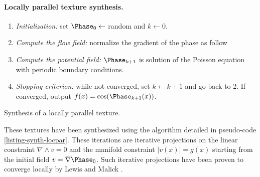 




\paragraph{Locally parallel texture synthesis.} 


\begin{listing}
\begin{enumerate}
	\item \textit{Initialization:} set $\Phase_0 \leftarrow $ random and $k \leftarrow 0$.
	\item \textit{Compute the flow field:} normalize the gradient of the phase as follow 
	\item \textit{Compute the potential field:} $\Phase_{k+1}$ is solution of the Poisson equation 
		with periodic boundary conditions.
	\item \textit{Stopping criterion:} while not converged, set $k \leftarrow k+1$ and go back to 2.
	If converged, output $f(x) = \cos(\Phase_{k+1}(x))$.
\end{enumerate}%
    \caption{Synthesis of a locally parallel texture. \label{listing-synth-locpar}}
\end{listing}
These textures have been synthesized using the algorithm detailed in pseudo-code \ref{listing-synth-locpar}. These iterations are iterative projections on the linear constraint $\nabla \wedge v = 0$ and the manifold constraint $|v(x)|=g(x)$ starting from the initial field $v=\nabla \Phase_0$. Such iterative projections have been proven to converge locally by Lewis and Malick \cite{lewis-alternating}. 




